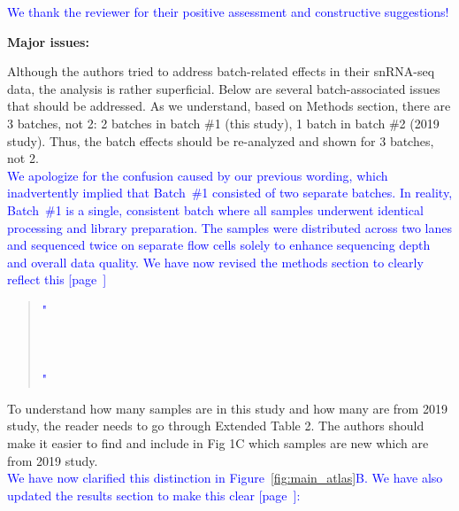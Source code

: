 \documentclass[12pt]{article}
\begin{document}
\textcolor{blue}{We thank the reviewer for their positive assessment and constructive suggestions!}

\textbf{Major issues:}

Although the authors tried to address batch-related effects in their snRNA-seq data, the analysis is rather superficial. Below are several batch-associated issues that should be addressed. As we understand, based on Methods section, there are 3 batches, not 2: 2 batches in batch \#1 (this study), 1 batch in batch \#2 (2019 study). Thus, the batch effects should be re-analyzed and shown for 3 batches, not 2.\\
\textcolor{blue}{We apologize for the confusion caused by our previous wording, which inadvertently implied that Batch \#1 consisted of two separate batches. In reality, Batch \#1 is a single, consistent batch where all samples underwent identical processing and library preparation. The samples were distributed across two lanes and sequenced twice on separate flow cells solely to enhance sequencing depth and overall data quality. We have now revised the methods section to clearly reflect this [page~\pageref{quoteJ-label}]}

\begin{quote}
	\textcolor{blue}{"\quoteJ\\ \\
	\quoteK\\ \\
	\quoteZ"}
\end{quote}

To understand how many samples are in this study and how many are from 2019 study, the reader needs to go through Extended Table 2. The authors should make it easier to find and include in Fig 1C which samples are new which are from 2019 study.\\
\textcolor{blue}{We have now clarified this distinction in Figure~\ref{fig:main_atlas}B. We have also updated the results section to make this clear [page~\pageref{quoteE-label}]:}

\begin{quote}
	\quoteE
\end{quote}
\end{document}
